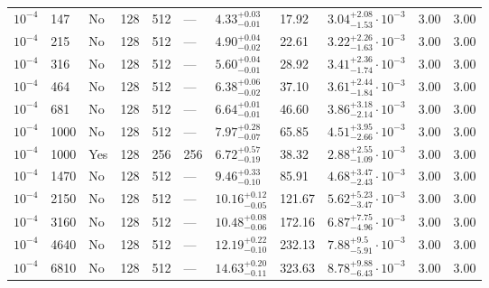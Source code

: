 \documentclass[aps, prfluids, onecolumn, notitlepage, nofootinbib, groupedaddress, amsfonts, amssymb, amsmath]{revtex4-1}
\begin{document}
\begin{center}
\begin{longtable}{ p{1cm} p{1cm} p{1cm} p{1cm} p{1cm} p{1cm} p{1.75cm} p{1.5cm} p{2.75cm} p{1cm} p{1.2cm}  }
\vspace{0.08cm}$10^{-4}$	&	147	&	No	&	128	&	512	&	---	&$	4.33	_{-	0.01	}^{+	0.03	}$&	17.92	&$	3.04	_{-	1.53	}^{+	2.08}\cdot 10^{-3}	$&	3.00	&	3.00	\\
\vspace{0.08cm}$10^{-4}$	&	215	&	No	&	128	&	512	&	---	&$	4.90	_{-	0.02	}^{+	0.04	}$&	22.61	&$	3.22	_{-	1.63	}^{+	2.26}\cdot 10^{-3}	$&	3.00	&	3.00	\\
\vspace{0.08cm}$10^{-4}$	&	316	&	No	&	128	&	512	&	---	&$	5.60	_{-	0.01	}^{+	0.04	}$&	28.92	&$	3.41	_{-	1.74	}^{+	2.36}\cdot 10^{-3}	$&	3.00	&	3.00	\\
\vspace{0.08cm}$10^{-4}$	&	464	&	No	&	128	&	512	&	---	&$	6.38	_{-	0.02	}^{+	0.06	}$&	37.10	&$	3.61	_{-	1.84	}^{+	2.44}\cdot 10^{-3}	$&	3.00	&	3.00	\\
\vspace{0.08cm}$10^{-4}$	&	681	&	No	&	128	&	512	&	---	&$	6.64	_{-	0.01	}^{+	0.01	}$&	46.60	&$	3.86	_{-	2.14	}^{+	3.18}\cdot 10^{-3}	$&	3.00	&	3.00	\\
\vspace{0.08cm}$10^{-4}$	&	1000	&	No	&	128	&	512	&	---	&$	7.97	_{-	0.07	}^{+	0.28	}$&	65.85	&$	4.51	_{-	2.66	}^{+	3.95}\cdot 10^{-3}	$&	3.00	&	3.00	\\
\vspace{0.08cm}$10^{-4}$	&	1000	&	Yes	&	128	&	256	&	256	&$	6.72	_{-	0.19	}^{+	0.57	}$&	38.32	&$	2.88	_{-	1.09	}^{+	2.55}\cdot 10^{-3}	$&	3.00	&	3.00	\\
\vspace{0.08cm}$10^{-4}$	&	1470	&	No	&	128	&	512	&	---	&$	9.46	_{-	0.10	}^{+	0.33	}$&	85.91	&$	4.68	_{-	2.43	}^{+	3.47}\cdot 10^{-3}	$&	3.00	&	3.00	\\
\vspace{0.08cm}$10^{-4}$	&	2150	&	No	&	128	&	512	&	---	&$	10.16	_{-	0.05	}^{+	0.12	}$&	121.67	&$	5.62	_{-	3.47	}^{+	5.23}\cdot 10^{-3}	$&	3.00	&	3.00	\\
\vspace{0.08cm}$10^{-4}$	&	3160	&	No	&	128	&	512	&	---	&$	10.48	_{-	0.06	}^{+	0.08	}$&	172.16	&$	6.87	_{-	4.96	}^{+	7.75}\cdot 10^{-3}	$&	3.00	&	3.00	\\
\vspace{0.08cm}$10^{-4}$	&	4640	&	No	&	128	&	512	&	---	&$	12.19	_{-	0.10	}^{+	0.22	}$&	232.13	&$	7.88	_{-	5.91	}^{+	9.5}\cdot 10^{-3}	$&	3.00	&	3.00	\\
\vspace{0.08cm}$10^{-4}$	&	6810	&	No	&	128	&	512	&	---	&$	14.63	_{-	0.11	}^{+	0.20	}$&	323.63	&$	8.78	_{-	6.43	}^{+	9.88}\cdot 10^{-3}	$&	3.00	&	3.00	\\

\end{longtable}
\end{center}
\end{document}
